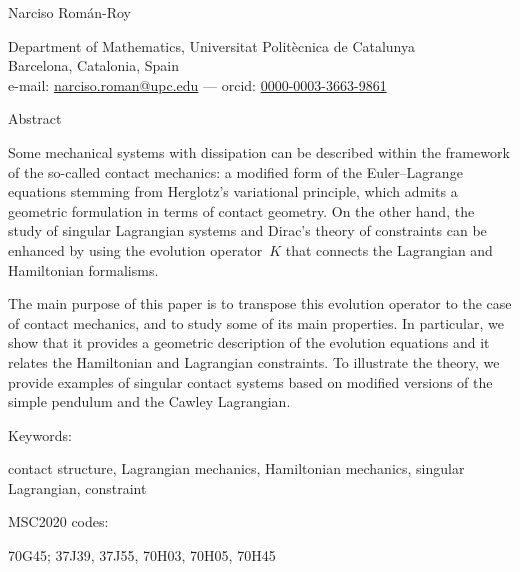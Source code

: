 \documentclass[11pt]{article}
\theoremstyle{plain}
\theoremstyle{definition}
\begin{document}
{\Large\raggedright\sffamily
    Narciso Román-Roy
}\vspace{1mm}\newline
{\raggedright
    Department of Mathematics, Universitat Politècnica de Catalunya\\
    Barcelona, Catalonia, Spain\\
    e-mail: 
    \href{mailto:narciso.roman@upc.edu}{narciso.roman@upc.edu} --- {\sc orcid}: 
    \href{https://orcid.org/0000-0003-3663-9861}{0000-0003-3663-9861}
}


\vspace{2em}

{\large\bf\raggedright
    Abstract
}\vspace{1mm}\newline
{%
\parindent 0pt

Some mechanical systems with dissipation can be described within the framework of the so-called contact mechanics: a modified form of the Euler--Lagrange equations stemming from Herglotz's variational principle, which admits a geometric formulation in terms of contact geometry. On the other hand, the study of singular Lagrangian systems and Dirac's theory of constraints can be enhanced by using the evolution operator~$K$ that connects the Lagrangian and Hamiltonian formalisms.

The main purpose of this paper is to transpose this evolution operator to the case of contact mechanics, and to study some of its main properties. In particular, we show that it provides a geometric description of the evolution equations and it relates the Hamiltonian and Lagrangian constraints. To illustrate the theory, we provide examples of singular contact systems based on modified versions of the simple pendulum and the Cawley Lagrangian.
}
\bigskip

{\large\bf\raggedright
    Keywords:
}
contact structure, Lagrangian mechanics, Hamiltonian mechanics, singular Lagrangian, constraint
\medskip

{\large\bf\raggedright
    MSC2020 codes:
}
70G45;
37J39,
37J55,
70H03,
70H05,
70H45

\bigskip
\end{document}
